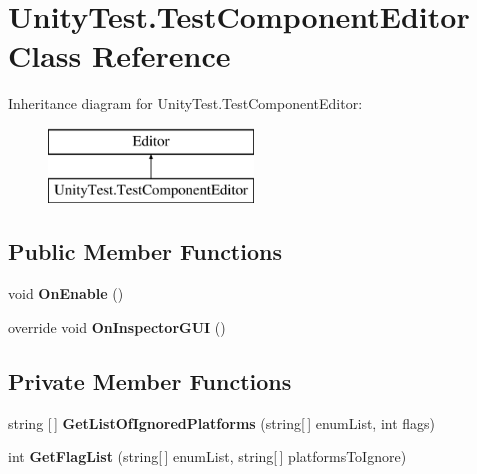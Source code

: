 \hypertarget{class_unity_test_1_1_test_component_editor}{}\section{Unity\+Test.\+Test\+Component\+Editor Class Reference}
\label{class_unity_test_1_1_test_component_editor}
Inheritance diagram for Unity\+Test.\+Test\+Component\+Editor\+:\begin{figure}[H]
\begin{center}
\leavevmode
\includegraphics[height=2.000000cm]{class_unity_test_1_1_test_component_editor}
\end{center}
\end{figure}
\subsection*{Public Member Functions}
\begin{DoxyCompactItemize}
\item 
\mbox{\label{class_unity_test_1_1_test_component_editor_ab5ac259dcc4171658f9cb2345cf9d5b8}} 
void {\bfseries On\+Enable} ()
\item 
\mbox{\label{class_unity_test_1_1_test_component_editor_a23d5143ea2fde23acc116c8ec5255ba5}} 
override void {\bfseries On\+Inspector\+G\+UI} ()
\end{DoxyCompactItemize}
\subsection*{Private Member Functions}
\begin{DoxyCompactItemize}
\item 
\mbox{\label{class_unity_test_1_1_test_component_editor_abe0975f473231ec74e8faebc14ecbfa1}} 
string \mbox{[}$\,$\mbox{]} {\bfseries Get\+List\+Of\+Ignored\+Platforms} (string\mbox{[}$\,$\mbox{]} enum\+List, int flags)
\item 
\mbox{\label{class_unity_test_1_1_test_component_editor_ae7bfaadf332c0fd8ceded89fab8a92c9}} 
int {\bfseries Get\+Flag\+List} (string\mbox{[}$\,$\mbox{]} enum\+List, string\mbox{[}$\,$\mbox{]} platforms\+To\+Ignore)
\end{DoxyCompactItemize}
